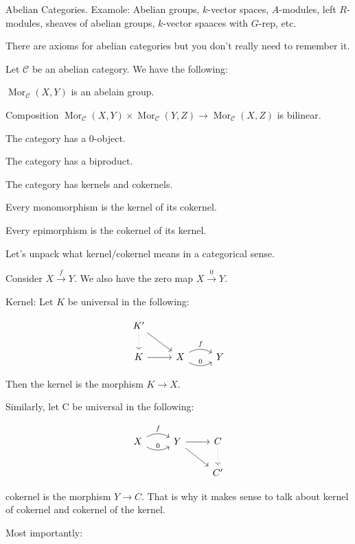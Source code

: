 \documentclass{article}
\theoremstyle{definition}
\begin{document}
    Abelian Categories. Examole: Abelian groups, \(k\)-vector spaces, \(A\)-modules, left \(R\)-modules, sheaves of abelian groups, \(k\)-vector spaaces with \(G\)-rep, etc.

    There are axioms for abelian categories but you don't really need to remember it.

    Let \(\mathcal{C}\) be an abelian category. We have the following:
    
    \(\operatorname{Mor}_{\mathcal{C}}(X,Y)\) is an abelain group.

    Composition \(\operatorname{Mor}_{\mathcal{C}}(X,Y) \times \operatorname{Mor}_{\mathcal{C}} (Y,Z) \to \operatorname{Mor}_{\mathcal{C}}(X,Z)\) is bilinear.

    The category has a \(0\)-object.

    The category has a biproduct.

    The category has kernels and cokernels.

    Every monomorphism is the kernel of its cokernel.

    Every epimorphism is the cokernel of its kernel.

    Let's unpack what kernel/cokernel means in a categorical sense.

    Consider \(X \xrightarrow{f} Y\). We also have the zero map \(X \xrightarrow{0} Y\).

    Kernel: Let \(K\) be universal in the following:

    \[
        \begin{tikzcd}
            K^{\prime} \ar[d, dotted] \ar[dr] \\
            K \ar[r] & X \ar[r, bend right,"0"] \ar[r, bend left, "f"] & Y 
        \end{tikzcd}
    \]

    Then the kernel is the morphism \(K \to X\).

    Similarly, let C be universal in the following:

    \[
        \begin{tikzcd}
            X \ar[r, bend right, "0"] \ar[r, bend left, "f"] & Y \ar[r] \ar[rd] & C \ar[d, dotted] \\ & & C^{\prime} 
        \end{tikzcd}
    \]

    cokernel is the morphism \(Y \to C\). That is why it makes sense to talk about kernel of cokernel and cokernel of the kernel.

    Most importantly:
\end{document}
